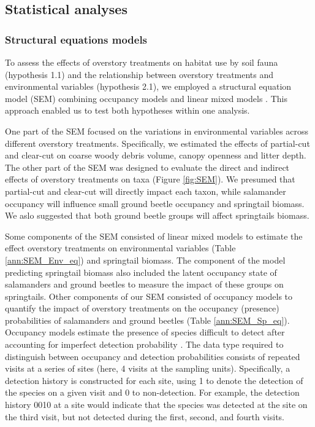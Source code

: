 \vspace{0.5cm}

\subsection*{Statistical analyses}
\label{subsec:analyses}


\subsubsection{Structural equations models} 

To assess the effects of overstory treatments on habitat use by soil fauna (hypothesis 1.1) and the relationship between overstory treatments 
and environmental variables (hypothesis 2.1), we employed a structural equation model (SEM) combining occupancy models and linear mixed models \citep{mackenzieOccupancyEstimationModeling2006a,graceSpecificationStructuralEquation2010,josephIntegratingOccupancyModels2016}.
This approach enabled us to test both hypotheses within one analysis. 

One part of the SEM focused on the variations in environmental variables across different overstory treatments. 
Specifically, we estimated the effects of partial-cut and clear-cut on coarse woody debris volume, canopy openness and litter depth. 
The other part of the SEM was designed to evaluate the direct and indirect effects of overstory treatments on taxa (Figure \ref{fig:SEM}). 
We presumed that partial-cut and clear-cut will directly impact each taxon, while salamander occupancy will influence small ground beetle occupancy and springtail biomass. 
We aslo suggested that both ground beetle groups will affect springtails biomass.

Some components of the SEM consisted of linear mixed models to estimate the effect overstory treatments on environmental variables (Table \ref{ann:SEM_Env_eq}) and springtail biomass. 
The component of the model predicting springtail biomass also included the latent occupancy state of salamanders and ground beetles to measure the impact of these groups on springtails. 
Other components of our SEM consisted of occupancy models to quantify the impact of overstory treatments on the occupancy (presence) probabilities of salamanders and ground beetles (Table \ref{ann:SEM_Sp_eq}). 
Occupancy models estimate the presence of species difficult to detect after accounting for imperfect detection probability \citep{mackenzieEstimatingSiteOccupancy2002,baileyEstimatingSiteOccupancy2004,mazerolleMakingGreatLeaps2007,spiersEstimatingSpeciesMisclassification2022}. 
The data type required to distinguish between occupancy and detection probabilities consists of repeated visits at a series of sites 
(here, 4 visits at the sampling units). Specifically, a detection history is constructed for each site, 
using 1 to denote the detection of the species on a given visit and 0 to non-detection. 
For example, the detection history 0010 at a site would indicate that the species was detected at the site on the third visit, but not detected during the first, 
second, and fourth visits. 

